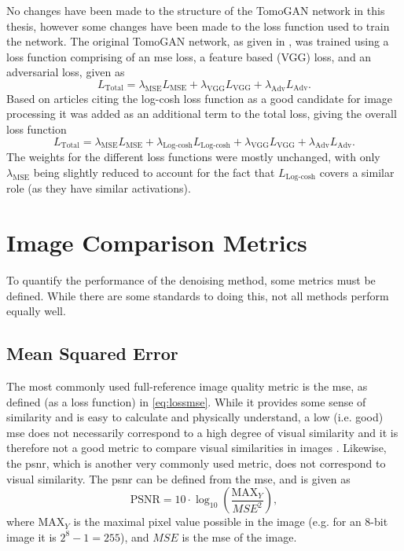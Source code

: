 No changes have been made to the structure of the TomoGAN network in this thesis, however some changes have been made to the loss function used to train the network. The original TomoGAN network, as given in \cite{liu2020tomogan}, was trained using a loss function comprising of an \gls{mse} loss, a feature based (VGG) loss, and an adversarial loss, given as 
\begin{equation}
    L_{\text{Total}} = \lambda_{\text{MSE}}L_{\text{MSE}} + \lambda_{\text{VGG}}L_{\text{VGG}} + \lambda_{\text{Adv}}L_{\text{Adv}}.
\end{equation}
Based on articles citing the log-cosh loss function as a good candidate for image processing \cite{7797130,chen2019log} it was added as an additional term to the total loss, giving the overall loss function
\begin{equation}
    L_{\text{Total}} = \lambda_{\text{MSE}}L_{\text{MSE}} + \lambda_{\text{Log-cosh}}L_{\text{Log-cosh}} + \lambda_{\text{VGG}}L_{\text{VGG}} + \lambda_{\text{Adv}}L_{\text{Adv}}.
\end{equation}
The weights for the different loss functions were mostly unchanged, with only $\lambda_\text{MSE}$ being slightly reduced to account for the fact that $L_\text{Log-cosh}$ covers a similar role (as they have similar activations). 

\section{Image Comparison Metrics}
\label{sec:method:metrics}
To quantify the performance of the denoising method, some metrics must be defined. While there are some standards to doing this, not all methods perform equally well. 

\subsection{Mean Squared Error}
\label{sec:method:metrics:mse}
The most commonly used full-reference image quality metric is the \gls{mse}, as defined (as a loss function) in \cref{eq:lossmse}. While it provides some sense of similarity and is easy to calculate and physically understand, a low (i.e. good) \gls{mse} does not necessarily correspond to a high degree of visual similarity and it is therefore not a good metric to compare visual similarities in images \cite{413502,477498}. Likewise, the \gls{psnr}, which is another very commonly used metric, does not correspond to visual similarity. The \gls{psnr} can be defined from the \gls{mse}, and is given as \cite{477498}
\begin{equation}
    \label{eq:psnr}
    \text{PSNR} = 10 \cdot \log_{10} \left( \frac{\text{MAX}_Y}{MSE^2} \right),
\end{equation}
where $\text{MAX}_Y$ is the maximal pixel value possible in the image (e.g. for an 8-bit image it is $2^8-1=255$), and $MSE$ is the \gls{mse} of the image. 

